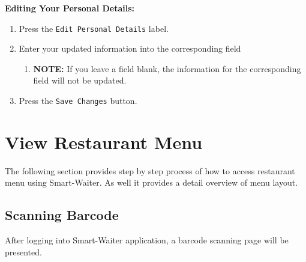 \documentclass[12pt, titlepage]{article}
\begin{document}
\textbf{Editing Your Personal Details:}
	\begin{enumerate}
		\item Press the \texttt{Edit Personal Details} label.
		\item Enter your updated information into the corresponding field
		\begin{enumerate}
			\item \textbf{NOTE:} If you leave a field blank, the 						information for the corresponding field will not be updated.
		\end{enumerate}
		\item Press the \texttt{Save Changes} button.
	\end{enumerate}

\section{View Restaurant Menu}
The following section provides step by step process of how to access restaurant menu using Smart-Waiter. As well it provides a detail overview of menu layout.
\subsection{Scanning Barcode}
After logging into Smart-Waiter application, a barcode scanning page will be presented.
\end{document}
